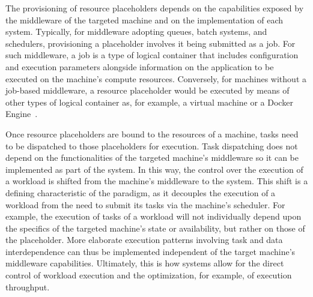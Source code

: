 \documentclass{sig-alternate}
\begin{document}
The provisioning of resource placeholders depends on the capabilities exposed by
the middleware of the targeted machine and on the implementation of each \pilot
system. Typically, for middleware adopting queues, batch systems, and
schedulers, provisioning a placeholder involves it being submitted as a job. For
such middleware, a job is a type of logical container that includes
configuration and execution parameters alongside information on the application
to be executed on the machine's compute resources. Conversely, for machines
without a job-based middleware, a resource placeholder would be executed by
means of other types of logical container as, for example, a virtual machine or
a Docker Engine~\cite{bernstein2014,felter2014}.


Once resource placeholders are bound to the resources of a machine, tasks need
to be dispatched to those placeholders for execution. Task dispatching does not
depend on the functionalities of the targeted machine's middleware so it can be
implemented as part of the \pilotjob system. In this way, the control over the
execution of a workload is shifted from the machine's middleware to the \pilot
system. This shift is a defining characteristic of the \pilot paradigm, as it
decouples the execution of a workload from the need to submit its tasks via the
machine's scheduler. For example, the execution of tasks of a workload will not
individually depend upon the specifics of the targeted machine's state or
availability, but rather on those of the placeholder. More elaborate execution
patterns involving task and data interdependence can thus be implemented
independent of the target machine's middleware capabilities. Ultimately, this is
how \pilotjob systems allow for the direct control of workload execution and the
optimization, for example, of execution throughput.


\end{document}
